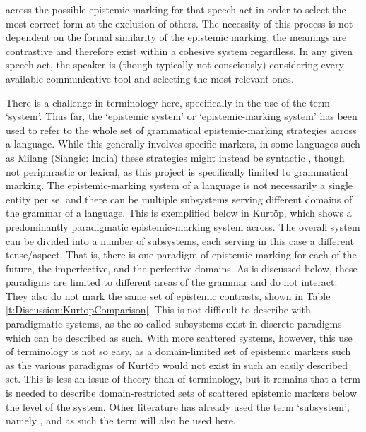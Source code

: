 across the possible epistemic marking for that speech act in order to select the most correct form at the exclusion of others. The necessity of this process is not dependent on the formal similarity of the epistemic marking, the meanings are contrastive and therefore exist within a cohesive system regardless. In any given speech act, the speaker is (though typically not consciously) considering every available communicative tool and selecting the most relevant ones. 

There is a challenge in terminology here, specifically in the use of the term `system'. Thus far, the `epistemic system' or `epistemic-marking system' has been used to refer to the whole set of grammatical epistemic-marking strategies across a language. While this generally involves specific markers, in some languages such as Milang (Siangic: India) these strategies might instead be syntactic \cite{Modi2017}, though not periphrastic or lexical, as this project is specifically limited to grammatical marking. The epistemic-marking system of a language is not necessarily a single entity per se, and there can be multiple subsystems serving different domains of the grammar of a language. This is exemplified below in Kurtöp, which shows a predominantly paradigmatic epistemic-marking system across. The overall system can be divided into a number of subsystems, each serving in this case a different tense/aspect. That is, there is one paradigm of epistemic marking for each of the future, the imperfective, and the perfective domains. As is discussed below, these paradigms are limited to different areas of the grammar and do not interact. They also do not mark the same set of epistemic contrasts, shown in Table \ref{t:Discussion:KurtopComparison}. This is not difficult to describe with paradigmatic systems, as the so-called subsystems exist in discrete paradigms which can be described as such. With more scattered systems, however, this use of terminology is not so easy, as a domain-limited set of epistemic markers such as the various paradigms of Kurtöp would not exist in such an easily described set. This is less an issue of theory than of terminology, but it remains that a term is needed to describe domain-restricted sets of scattered epistemic markers below the level of the system. Other literature has already used the term `subsystem', namely , and as such the term will also be used here.

